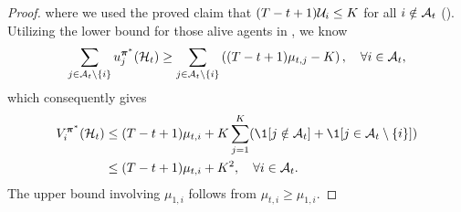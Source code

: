 \begin{proof}
where we used the proved claim that $(T-t+1)\mathcal{U}_i\leq K$ for all $i\notin \mathcal{A}_t$ ().
Utilizing the lower bound for those alive agents in , we know
\begin{equation*}
\sum_{j\in\mathcal{A}_t\setminus\{i\}} u_{j}^{{\bm \pi}^\ast}(\mathcal{H}_{t})\ge \sum_{j\in\mathcal{A}_t\setminus\{i\}} \left ((T-t+1)\mu_{t,j}-K\right ),\quad \forall i\in \mathcal{A}_t,
\end{equation*}
which consequently gives
\begin{align*}
V_i^{{\bm \pi}^\ast}(\mH_{t})&\le (T-t+1)\mu_{t,i}+K \sum_{j=1}^K (\1[j\notin \mA_t]+\1[j\in \mA_t\setminus \{i\}])\\&\le (T-t+1)\mu_{t,i}+K^2,\quad \forall i\in \mA_t.
\end{align*}
The upper bound involving $\mu_{1,i}$ follows from $\mu_{t,i}\geq \mu_{1,i}$.
\end{proof}

